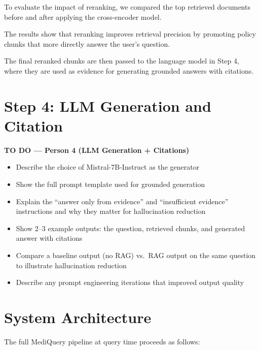 \documentclass[12pt, letterpaper]{article}
\begin{document}
To evaluate the impact of reranking, we compared the top retrieved documents before and after applying the cross-encoder model.  

The results show that reranking improves retrieval precision by promoting policy chunks that more directly answer the user's question.

The final reranked chunks are then passed to the language model in Step 4, where they are used as evidence for generating grounded answers with citations.

\section{Step 4: LLM Generation and Citation}

\begin{todobox}
\textbf{TO DO --- Person 4 (LLM Generation + Citations)}

\begin{itemize}[noitemsep, topsep=4pt]
    \item Describe the choice of Mistral-7B-Instruct as the generator
    \item Show the full prompt template used for grounded generation
    \item Explain the ``answer only from evidence'' and ``insufficient evidence''
          instructions and why they matter for hallucination reduction
    \item Show 2--3 example outputs: the question, retrieved chunks, and generated answer
          with citations
    \item Compare a baseline output (no RAG) vs.\ RAG output on the same question to
          illustrate hallucination reduction
    \item Describe any prompt engineering iterations that improved output quality
\end{itemize}
\end{todobox}

\section{System Architecture}

The full MediQuery pipeline at query time proceeds as follows:
\end{document}
